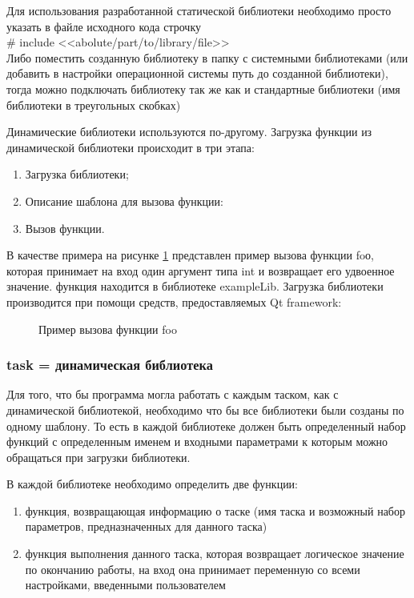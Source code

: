 Для использования разработанной статической библиотеки необходимо просто указать в файле исходного кода строчку \\
\# include <<abolute/part/to/library/file>> \\
Либо поместить созданную библиотеку в папку с системными библиотеками (или добавить в настройки операционной системы путь до созданной библиотеки), тогда можно подключать библиотеку так же как и стандартные библиотеки (имя библиотеки в треугольных скобках)

Динамические библиотеки используются по-другому. Загрузка функции из динамической библиотеки происходит в три этапа: 

\begin{enumerate}
\item Загрузка библиотеки;
\item Описание шаблона для вызова функции:
\item Вызов функции.
\end{enumerate}

В качестве примера на рисунке \ref{ris:dinLib} представлен пример вызова функции foо, которая принимает на вход один аргумент типа int и возвращает его удвоенное значение. функция находится в библиотеке exampleLib. Загрузка библиотеки производится при помощи средств, предоставляемых Qt framework: 

\begin{figure}[ht] 
\caption{Пример вызова функции foo}
\label{ris:dinLib}
\end{figure}

\subsubsection{task = динамическая библиотека}

Для того, что бы программа могла работать с каждым таском, как с динамической библиотекой, необходимо что бы все библиотеки были созданы по одному шаблону. То есть в каждой библиотеке должен быть определенный набор функций с определенным именем и входными параметрами к которым можно обращаться при загрузки библиотеки. 

В каждой библиотеке необходимо определить две функции:

\begin{enumerate}
\item функция, возвращающая информацию о таске (имя таска и возможный набор параметров, предназначенных для данного таска)
\item функция выполнения данного таска, которая возвращает логическое значение по окончанию работы, на вход она принимает переменную со всеми настройками, введенными пользователем
\end{enumerate}

